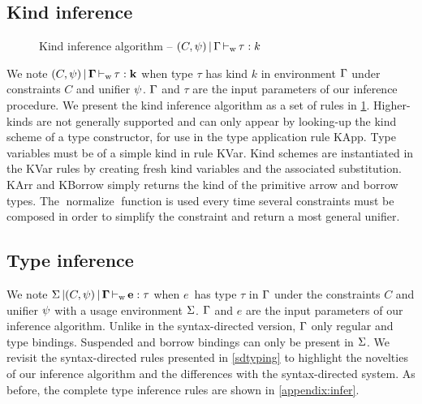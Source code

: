\subsection{Kind inference}
%
\begin{figure}[t]
  \centering
  
  \caption{Kind inference algorithm -- $(C,\mathrm{\psi}) \operatorname{|} \Gamma \operatorname{\vdash_w} \tau : k$}
  \label{rules:kinding}
\end{figure}
%
We note $(C,\mathrm{\psi}) \operatorname{|} \bf{\Gamma} \operatorname{\vdash_w} \bf{\tau} : k$ when type $\tau$ has kind $k$
in environment $\Gamma$ under constraints $C$ and unifier $\mathrm{\psi}$.
$\Gamma$ and $\tau$ are the input parameters of
our inference procedure.
We present the kind inference algorithm as a set of rules in
\cref{rules:kinding}.
Higher-kinds are not generally supported
and can only appear by looking-up the kind scheme of a type constructor,
for use in the type application rule {\sc KApp}.
Type variables must be of a simple kind in rule {\sc KVar}.
Kind schemes are instantiated in the {\sc KVar} rules by creating
fresh kind variables and the associated substitution.
{\sc KArr} and {\sc KBorrow} simply returns the kind of the primitive
arrow and borrow types.
The $\operatorname{normalize}$ function is used every time several constraints
must be composed in order to simplify the constraint and return a most general
unifier.




\subsection{Type inference}

We note $\Sigma \operatorname{|} (C,\mathrm{\psi}) \operatorname{|} \bf{\Gamma} \operatorname{\vdash_w} \bf{e} : \tau$ when
$e$\ has type $\tau$ in $\Gamma$ under the constraints $C$ and unifier $\mathrm{\psi}$
with a usage environment $\Sigma$. $\Gamma$ and $e$ are the input parameters of our
inference algorithm.
Unlike in the syntax-directed version, $\Gamma$ only regular and type bindings.
Suspended and borrow bindings can only be present in $\Sigma$.
We revisit the syntax-directed rules presented in \cref{sdtyping} to highlight the
novelties
of our inference algorithm and the differences with the syntax-directed
system.
As before, the complete type inference rules are shown in \cref{appendix:infer}.

